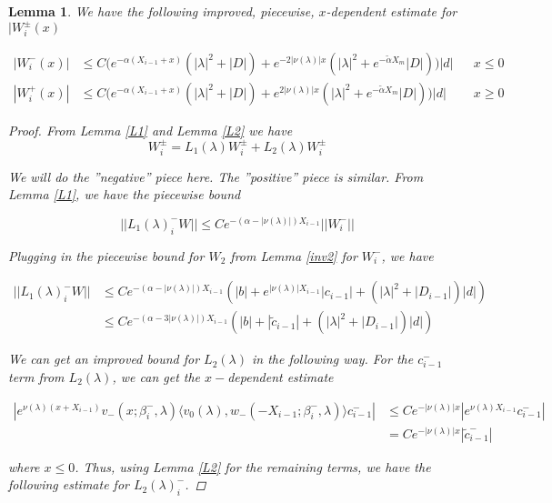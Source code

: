\documentclass[12pt]{article}
\newtheorem{lemma}{Lemma}
\begin{document}
\begin{lemma}\label{Wboundimproved}
We have the following improved, piecewise, $x$-dependent estimate for $|W_i^\pm(x)$

\begin{align*}
| W_i^-(x)| &\leq C \Big(e^{-\alpha(X_{i-1} + x)}( |\lambda|^2 + |D|)
+ e^{-2|\nu(\lambda)|x}( |\lambda|^2 + e^{-\tilde{\alpha} X_m}|D|) \Big)|d| && x \leq 0 \\
| W_i^+(x)| &\leq C \Big(e^{-\alpha(X_{i-1} + x)}( |\lambda|^2 + |D|)
+ e^{2|\nu(\lambda)|x}( |\lambda|^2 + e^{-\tilde{\alpha} X_m}|D|) \Big)|d| && x \geq 0
\end{align*}

\begin{proof}

From Lemma \ref{L1} and Lemma \ref{L2} we have
\[
W_i^\pm = L_1(\lambda)W_i^\pm + L_2(\lambda)W_i^\pm 
\]

We will do the ''negative'' piece here. The ''positive'' piece is similar. From Lemma \ref{L1}, we have the piecewise bound

\[
||L_1(\lambda)_i^- W|| \leq C e^{-(\alpha -|\nu(\lambda)|)X_{i-1}} ||W_i^-||
\]

Plugging in the piecewise bound for $W_2$ from Lemma \ref{inv2} for $W_i^-$, we have

\begin{align*}
||L_1(\lambda)_i^- W|| &\leq C e^{-(\alpha -|\nu(\lambda)|)X_{i-1}} ( |b| + e^{|\nu(\lambda)|X_{i-1}}|c_{i-1}| + (|\lambda|^2 + |D_{i-1}|)|d| ) \\
&\leq C e^{-(\alpha - 3|\nu(\lambda)|)X_{i-1}} ( |b| + |\tilde{c}_{i-1}| + (|\lambda|^2 + |D_{i-1}|)|d| ) 
\end{align*}

We can get an improved bound for $L_2(\lambda)$ in the following way. For the $c_{i-1}^-$ term from $L_2(\lambda)$, we can get the $x-$dependent estimate

\begin{align*}
|e^{\nu(\lambda)(x+X_{i-1})} v_-(x; \beta_i^-, \lambda) \langle v_0(\lambda), w_-(-X_{i-1}; \beta_i^-, \lambda) \rangle c_{i-1}^-| &\leq C e^{-|\nu(\lambda)| x }| e^{\nu(\lambda)X_{i-1}} c_{i-1}^-| \\
&= C e^{-|\nu(\lambda)| x }| \tilde{c}_{i-1}^-|
\end{align*}

where $x \leq 0$. Thus, using Lemma \ref{L2} for the remaining terms, we have the following estimate for $L_2(\lambda)_i^-$.


\end{proof}
\end{lemma}
\end{document}

